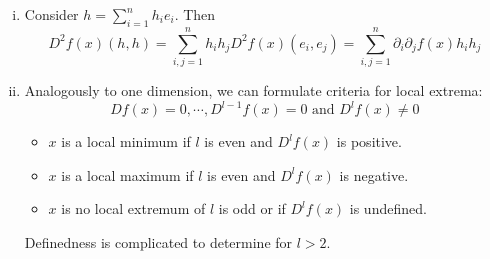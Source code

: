 \documentclass[../../script.tex]{subfiles}
\begin{document}
\begin{rem}
    \begin{enumerate}[(i)]
        \item Consider $h = \sum_{i=1}^n h_ie_i$. Then
        \[
            D^2f(x)(h, h) = \sum_{i, j = 1}^n h_i h_j D^2f(x)(e_i, e_j) = \sum_{i, j = 1}^n \partial_i \partial_j f(x) h_i h_j
        \]

        \item Analogously to one dimension, we can formulate criteria for local extrema:
        \[
            Df(x) = 0, \cdots, D^{l-1}f(x) = 0 \text{ and } D^lf(x) \ne 0
        \]
        \begin{itemize}
            \item $x$ is a local minimum if $l$ is even and $D^lf(x)$ is positive.
            \item $x$ is a local maximum if $l$ is even and $D^lf(x)$ is negative.
            \item $x$ is no local extremum of $l$ is odd or if $D^lf(x)$ is undefined.
        \end{itemize}
        Definedness is complicated to determine for $l > 2$.
    \end{enumerate}
\end{rem}
\end{document}

